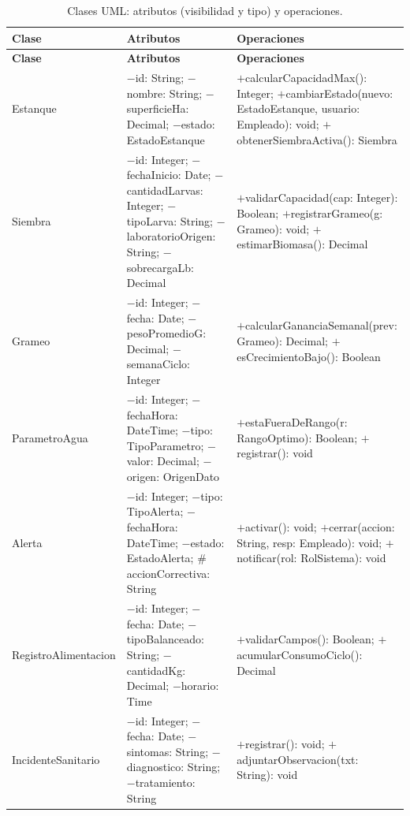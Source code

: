 \documentclass[11pt,a4paper]{article}
\renewcommand{\_}{\textunderscore\allowbreak}
\begin{document}
\begin{longtable}{|p{3.9cm}|p{5.1cm}|p{5.5cm}|}
\caption{Clases UML: atributos (visibilidad y tipo) y operaciones.}
\label{tab:clases}\\
\hline
\textbf{Clase} & \textbf{Atributos} & \textbf{Operaciones}\\
\hline
\endfirsthead

\hline
\textbf{Clase} & \textbf{Atributos} & \textbf{Operaciones}\\
\hline
\endhead

\hline
\endfoot

\hline
\endlastfoot

Estanque &
$-$id: String; $-$nombre: String; $-$superficieHa: Decimal; $-$estado: EstadoEstanque &
$+$calcularCapacidadMax(): Integer; $+$cambiarEstado(nuevo: EstadoEstanque, usuario: Empleado): void; $+$obtenerSiembraActiva(): Siembra\\
\hline

Siembra &
$-$id: Integer; $-$fechaInicio: Date; $-$cantidadLarvas: Integer; $-$tipoLarva: String; $-$laboratorioOrigen: String; $-$sobrecargaLb: Decimal &
$+$validarCapacidad(cap: Integer): Boolean; $+$registrarGrameo(g: Grameo): void; $+$estimarBiomasa(): Decimal\\
\hline

Grameo &
$-$id: Integer; $-$fecha: Date; $-$pesoPromedioG: Decimal; $-$semanaCiclo: Integer &
$+$calcularGananciaSemanal(prev: Grameo): Decimal; $+$esCrecimientoBajo(): Boolean\\
\hline

ParametroAgua &
$-$id: Integer; $-$fechaHora: DateTime; $-$tipo: TipoParametro; $-$valor: Decimal; $-$origen: OrigenDato &
$+$estaFueraDeRango(r: RangoOptimo): Boolean; $+$registrar(): void\\
\hline

Alerta &
$-$id: Integer; $-$tipo: TipoAlerta; $-$fechaHora: DateTime; $-$estado: EstadoAlerta; $\#$accionCorrectiva: String &
$+$activar(): void; $+$cerrar(accion: String, resp: Empleado): void; $+$notificar(rol: RolSistema): void\\
\hline

RegistroAlimentacion &
$-$id: Integer; $-$fecha: Date; $-$tipoBalanceado: String; $-$cantidadKg: Decimal; $-$horario: Time &
$+$validarCampos(): Boolean; $+$acumularConsumoCiclo(): Decimal\\
\hline

IncidenteSanitario &
$-$id: Integer; $-$fecha: Date; $-$sintomas: String; $-$diagnostico: String; $-$tratamiento: String &
$+$registrar(): void; $+$adjuntarObservacion(txt: String): void\\
\hline


\end{longtable}
\end{document}
